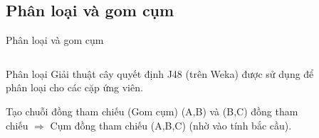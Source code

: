 \documentclass[9pt,xcolor=table,hyperref=unicode]{beamer}
\begin{document}
	\subsection{Phân loại và gom cụm}
	\begin{frame}{Phân loại và gom cụm}		
		\begin{columns}[t]
			\begin{column}{0.6\textwidth}
			   	\begin{block}{Phân loại}
					Giải thuật cây quyết định J48 (trên Weka) được sử dụng để phân loại cho các cặp ứng viên.
				\end{block}	
				\begin{block}{Tạo chuỗi đồng tham chiếu (Gom cụm)}
			   		(A,B) và (B,C) đồng tham chiếu $\Rightarrow$ Cụm đồng tham chiếu (A,B,C) (nhờ vào tính bắc cầu).
				\end{block}			
			\end{column}
			\begin{column}{0.4\textwidth}  %
			 	\begin{figure}[H]
					\fontsize{13pt}{13}\selectfont
					\centering				
					\resizebox{30mm}{!}{}	
				\end{figure}
			\end{column}
		\end{columns}
		\begin{columns}[t]			
			\begin{column}{\textwidth}				
			   	\begin{figure}[H]
					\LARGE 
					\resizebox{100mm}{!}{}										
				\end{figure}
			\end{column}			
		\end{columns}
	\end{frame}
\end{document}
